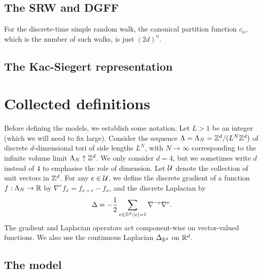 \subsection{The SRW and DGFF}


For the discrete-time simple random walk, the canonical partition function $c_n$,
which is the number of such walks, is just $(2 d)^n$.


\subsection{The Kac-Siegert representation}




\pagebreak

\section{Collected definitions}

Before defining the models, we establish some notation.
Let $L > 1$ be an integer (which we will need to fix large).
Consider the sequence $\Lambda=\Lambda_N = {\mathbb Z}^d/(L^N{\mathbb Z}^d)$ of
discrete $d$-dimensional tori of side lengths $L^N$,
with $N \to \infty$ corresponding to the infinite volume limit $\Lambda_N \uparrow {\mathbb Z}^d$.
We only consider $d=4$, but we sometimes write $d$ instead of $4$
to emphasise the role of dimension.
Let $\mathcal{U}$ denote the collection of unit vectors in ${ {{\mathbb Z}}^d }$. %
For any $e \in \mathcal{U}$, %
we define the discrete gradient of a function $f:\Lambda_N \rightarrow {\mathbb R}$
by $\nabla^e f_x = f_{x + e} - f_x$, and
the discrete Laplacian by
\begin{equation}
\label{e:DeltaLambda}
\Delta = -\frac{1}{2}\sum_{e\in{\mathbb Z}^d:|e| = 1}\nabla^{-e} \nabla^{e}.
\end{equation}
The gradient and Laplacian operators act component-wise on vector-valued functions.
We also use the
continuous Laplacian $\Delta_{{ {{\mathbb R}}^d}}$ on ${ {{\mathbb R}}^d}$.

\subsection{The \texorpdfstring{\phifour}{phi4} model}

